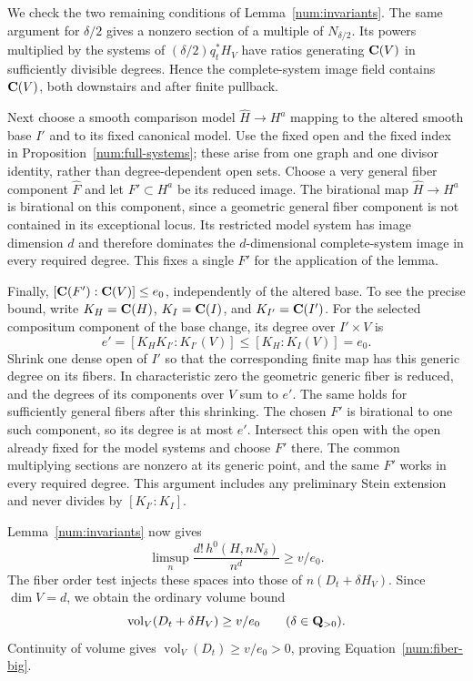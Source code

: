 We check the two remaining conditions of Lemma~\ref{num:invariants}.
The same argument for $\delta/2$ gives a nonzero section of a
multiple of $N_{\delta/2}$.  Its powers multiplied by the systems of
$(\delta/2)q_t^*H_V$ have ratios generating $\mathbf C(V)$ in sufficiently
divisible degrees.  Hence the complete-system image field contains
$\mathbf C(V)$, both downstairs and after finite pullback.

Next choose a smooth comparison model $\widehat H\to H^a$ mapping
to the altered smooth base $I'$ and to its fixed canonical model.
Use the fixed open and the fixed index in
Proposition~\ref{num:full-systems}; these arise from one graph and
one divisor identity, rather than degree-dependent open sets.
Choose a very general fiber component $\widehat F$ and let
$F'\subset H^a$ be its reduced image.  The birational map
$\widehat H\to H^a$ is birational on this component, since a
geometric general fiber component is not contained in its exceptional
locus.  Its restricted model system has image dimension $d$ and therefore
dominates the $d$-dimensional complete-system image in every required
degree.  This fixes a single $F'$ for the application of the lemma.

Finally, $[\mathbf C(F'): \mathbf C(V)]\leq e_0$, independently of the altered
base. To see the precise bound, write $K_H=\mathbf C(H)$,
$K_I=\mathbf C(I)$, and $K_{I'}=\mathbf C(I')$. For the selected compositum
component of the base change, its degree over $I'\times V$ is
\[
 e'=[K_HK_{I'}:K_{I'}(V)]\leq
       [K_H:K_I(V)]=e_0.
\]
Shrink one dense open of $I'$ so that the corresponding finite
map has this generic degree on its fibers. In characteristic zero
the geometric generic fiber is reduced, and the degrees of its
components over $V$ sum to $e'$. The same holds for sufficiently
general fibers after this shrinking. The chosen $F'$ is birational
to one such component, so its degree is at most $e'$. Intersect this
open with the open already fixed for the model systems and choose
$F'$ there. The common multiplying sections are nonzero at its
generic point, and the same $F'$ works in every required degree.
This argument includes any preliminary Stein extension and never
divides by $[K_{I'}:K_I]$.

Lemma~\ref{num:invariants} now gives
\[
 \limsup_n\frac{d!\,h^0(H,nN_\delta)}{n^d}\geq v/e_0.
\]
The fiber order test injects these spaces into those of
$n(D_t+\delta H_V)$.  Since $\dim V=d$, we obtain the ordinary
volume bound
\[
 \operatorname{vol}_V(D_t+\delta H_V)\geq v/e_0
 \qquad(\delta\in\mathbf Q_{>0}).
\]
Continuity of volume \cite[Section~2.2.C]{Lazarsfeld} gives
$\operatorname{vol}_V(D_t)\geq v/e_0>0$, proving
Equation~\eqref{num:fiber-big}.


